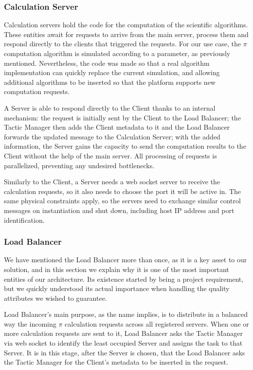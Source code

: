\documentclass[12pt]{article}
\begin{document}
\subsubsection{Calculation Server}

Calculation servers hold the code for the computation of the scientific algorithms.
These entities await for requests to arrive from the main server, process them and respond directly to the clients that triggered the requests.
For our use case, the $\pi$ computation algorithm is simulated according to a parameter, as previously mentioned.
Nevertheless, the code was made so that a real algorithm implementation can quickly replace the current simulation, and allowing additional algorithms to be 
inserted so that the platform supports new computation requests.

A Server is able to respond directly to the Client thanks to an internal mechanism:
the request is initially sent by the Client to the Load Balancer;
the Tactic Manager then adds the Client metadata to it and the Load Balancer forwards the updated message to the Calculation Server;
with the added information, the Server gains the capacity to send the computation results to the Client without the help of the main server.
All processing of requests is parallelized, preventing any undesired bottlenecks.

Similarly to the Client, a Server needs a web socket server to receive the calculation requests, so it also needs to choose the port it will be active in. 
The same physical constraints apply, so the servers need to exchange similar control messages on instantiation and shut down, including host IP address and port identification.

\subsubsection{Load Balancer} \label{lb}

We have mentioned the Load Balancer more than once, as it is a key asset to our solution, and in this section we explain why it is one of the most important 
entities of our architecture.
Its existence started by being a project requirement, but we quickly understood its actual importance when handling the quality attributes we wished to guarantee.

Load Balancer's main purpose, as the name implies, is to distribute in a balanced way the incoming $\pi$ calculation requests across all registered servers. 
When one or more calculation requests are sent to it, Load Balancer asks the Tactic Manager via web socket to identify the least occupied Server and assigns the 
task to that Server.
It is in this stage, after the Server is chosen, that the Load Balancer asks the Tactic Manager for the Client's metadata to be inserted in the request.
\end{document}
